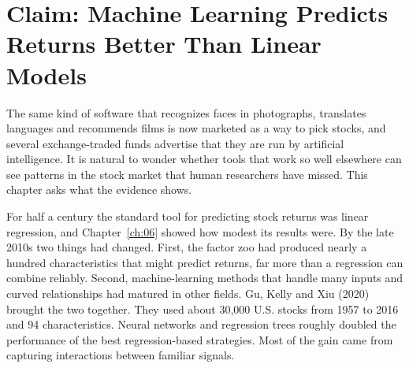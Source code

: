 \makeatletter
{}
\makeatother

\makeatletter
\makeatother

\chapter{Claim: Machine Learning Predicts Returns Better Than Linear Models}
\label{ch:19}

The same kind of software that recognizes faces in photographs, translates languages and recommends films is now marketed as a way to pick stocks, and several exchange-traded funds advertise that they are run by artificial intelligence. It is natural to wonder whether tools that work so well elsewhere can see patterns in the stock market that human researchers have missed. This chapter asks what the evidence shows.

For half a century the standard tool for predicting stock returns was linear regression, and Chapter~\ref{ch:06} showed how modest its results were. By the late 2010s two things had changed. First, the factor zoo had produced nearly a hundred characteristics that might predict returns, far more than a regression can combine reliably. Second, machine-learning methods that handle many inputs and curved relationships had matured in other fields. Gu, Kelly and Xiu (2020) brought the two together. They used about 30,000 U.S. stocks from 1957 to 2016 and 94 characteristics. Neural networks and regression trees roughly doubled the performance of the best regression-based strategies. Most of the gain came from capturing interactions between familiar signals.

